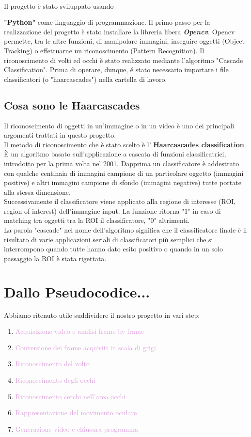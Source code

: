 \documentclass[12pt]{article}
\begin{document}
\\Il progetto \`e stato sviluppato usando {\textbf{"Python"} come linguaggio di programmazione. Il primo passo per la realizzazione del progetto \`e stato installare la libreria libera \textit{\textbf{Opencv}}. Opencv permette, tra le altre funzioni, di manipolare immagini, inseguire oggetti (Object Tracking) o effettuarne un riconoscimento (Pattern Recognition). Il riconoscimento di volti ed occhi \`e stato realizzato mediante l'algoritmo "Cascade Classification". Prima di operare, dunque, \'e stato necessario importare i file classificatori (o "haarcascades") nella cartella di lavoro.

	\subsection{Cosa sono le Haarcascades}
	Il riconoscimento di oggetti in un'immagine o in un video \`e uno dei principali argomenti trattati in questo progetto. \\
	Il metodo di riconoscimento che \`e stato scelto \`e l' \textbf{Haarcascades classification}. \`E un algoritmo basato sull'applicazione a cascata di funzioni classificatrici, introdotto per la prima volta nel 2001. 
	Dapprima un classificatore è addestrato con qualche centinaia di immagini campione di un particolare oggetto (immagini positive) e altri immagini campione di sfondo (immagini negative) tutte portate alla stessa dimensione. \\ Successivamente il classificatore viene applicato alla regione di interesse (ROI, region of interest) dell'immagine input. La funzione ritorna "1" in caso di matching tra oggetti tra la ROI il classificatore, "0" altrimenti. \\
	La parola "cascade" nel nome dell'algoritmo significa che il classificatore finale \`e il risultato di varie applicazioni seriali di classificatori pi\`u semplici che si interrompono quando tutte hanno dato esito positivo o quando in un solo passaggio la ROI \`e stata rigettata.
\pagebreak

\section{Dallo Pseudocodice...}
Abbiamo ritenuto utile suddividere il nostro progetto in vari step:
\begin{enumerate}
	\item \label{primo}\textcolor{Plum}{Acquisizione video e analisi frame by frame}
	\item \label{secondo} \textcolor{Plum}{Conversione dei frame acquisiti in scala di grigi}
	\item \label{terzo} \textcolor{Plum}{Riconoscimento del volto}
	\item \label{quarto}\textcolor{Plum}{Riconoscimento degli occhi}
    \item \label{quinto}\textcolor{Plum}{Riconoscimento cerchi nell'area occhi}
    \item \label{sesto}\textcolor{Plum}{Rappresentazione del movimento oculare}
    \item \label{settimo}\textcolor{Plum}{Generazione video e chiusura programma}
\end{enumerate}

}
\end{document}
